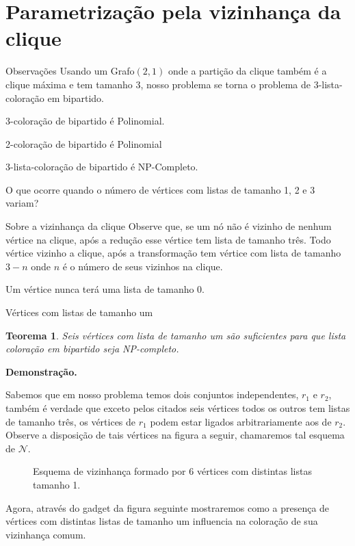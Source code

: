 \documentclass[9pt, compress]{beamer}
\newtheorem{teorema}{Teorema}
\begin{document}
     \section{Parametrização pela vizinhança da clique}
     \begin{frame}{Observações}
       Usando um Grafo$(2,1)$ onde a partição da clique também é a clique máxima e tem tamanho 3, nosso problema se torna o problema de 3-lista-coloração em bipartido.
       
       3-coloração de bipartido é Polinomial.
       
       2-coloração de bipartido é Polinomial 
       
       3-lista-coloração de bipartido é NP-Completo.
       
       O que ocorre quando o número de vértices com listas de tamanho 1, 2 e 3 variam? 
     \end{frame}
     \begin{frame}{Sobre a vizinhança da clique}
       Observe que, se um nó não é vizinho de nenhum vértice na clique, após a redução esse vértice tem lista de tamanho três. Todo vértice vizinho a clique, após a transformação tem vértice com lista de tamanho $3-n$ onde $n$ é o número de seus vizinhos na clique.
       
       Um vértice nunca terá uma lista de tamanho 0.
     \end{frame}
     \begin{frame}{Vértices com listas de tamanho um}
       \begin{teorema}
       Seis vértices com lista de tamanho um são suficientes para que lista coloração em bipartido seja NP-completo.
       \end{teorema}
       \textbf{Demonstração.}
       
       Sabemos que em nosso problema temos dois conjuntos independentes, $r_1$ e $r_2$, também é verdade que exceto pelos citados seis vértices todos os outros tem listas de tamanho três, os vértices de $r_1$ podem estar ligados arbitrariamente aos de $r_2$. Observe a disposição de tais vértices na figura a seguir, chamaremos tal esquema de $\mathcal{N}$.
     \end{frame}
     \begin{frame}
        
        \begin{figure}[H]
		        \centering
		        \fontsize{4}{10}
		        
		        \caption{Esquema de vizinhança formado por 6 vértices com distintas listas tamanho 1. }
		        \label{fig:seis-vertices-lista-um}
        \end{figure}
    
        Agora, através do gadget da figura seguinte mostraremos como a presença de vértices com distintas listas de tamanho um influencia na coloração de sua vizinhança comum.
      \end{frame}
\end{document}
